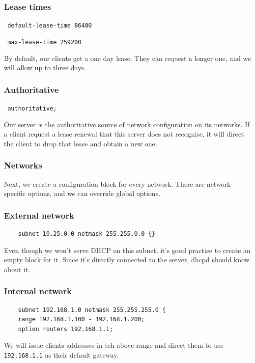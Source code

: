\documentclass[10pt]{beamer}
\begin{document}
\begin{frame}
	\frametitle{Lease times}
	
	\texttt{ default-lease-time 86400 }
	
	\vspace{5mm}
	\texttt{ max-lease-time 259200 }
	
	\vspace{5mm}
	By default, our clients get a one day lease.  They can request a longer one,
	and we will allow up to three days.
	
	
\end{frame}
\begin{frame}
	\frametitle{Authoritative}
	
	\texttt{ authoritative; }
	
	\vspace{5mm}
	Our server is the authoritative source of network configuration on its networks. If a client request a lease renewal that this server does not recognise, it will direct the client to drop that lease and obtain a new one.
	
\end{frame}
\begin{frame}
	\frametitle{Networks}
	
	Next, we create a configuration block for every network.  There are network-specific options, and we can override global options.
\end{frame}
\begin{frame}[fragile]
	\frametitle{External network}
	\begin{verbatim}
	subnet 10.25.0.0 netmask 255.255.0.0 {}
	\end{verbatim}  
	
	Even though we won't serve DHCP on this subnet, it's good practice to 
	create an empty block for it.  Since it's directly connected to the server,
	dhcpd should know about it.
	
\end{frame}

\begin{frame}[fragile]
	\frametitle{Internal network}
	\begin{verbatim}
	subnet 192.168.1.0 netmask 255.255.255.0 {
	range 192.168.1.100 - 192.168.1.200;
	option routers 192.168.1.1;
	\end{verbatim}
	
	We will issue clients addresses in teh above range and direct them to use \texttt{192.168.1.1} as their default gateway.
\end{frame}
	
\end{document}

